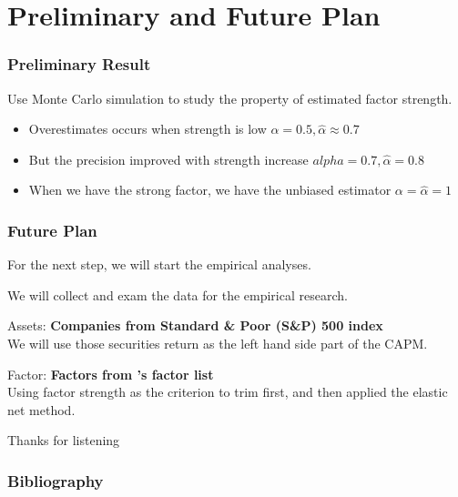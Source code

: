 \documentclass[12pt]{beamer}
\begin{document}
\section{Preliminary and Future Plan}


\begin{frame}
	\frametitle{Preliminary Result}
Use Monte Carlo simulation to study the property of estimated factor strength.\\
\begin{itemize}
\item Overestimates occurs when strength is low $\alpha = 0.5, \hat{\alpha} \approx 0.7$
\item But the precision improved with strength increase $alpha = 0.7, \hat{\alpha} = 0.8$
\item When we have the strong factor, we have the unbiased estimator $\alpha = \hat{\alpha} = 1$
\end{itemize}
	
\end{frame}

\begin{frame}
\frametitle{Future Plan}
For the next step, we will start the empirical analyses. 

We will collect and exam the data for the empirical research. 

Assets: {\bf Companies from Standard \& Poor (S\&P) 500 index}\\
We will use those securities return as the left hand side part of the CAPM.

Factor: {\bf Factors from 's factor list}\\
Using factor strength as the criterion to trim first, and then applied the elastic net method.

\end{frame}
\begin{frame}
	\centering	
\huge{ Thanks for listening\\}
\end{frame}


\begin{frame}[allowframebreaks]
	\frametitle{Bibliography}
	
{\footnotesize}
\end{frame}
\end{document}
